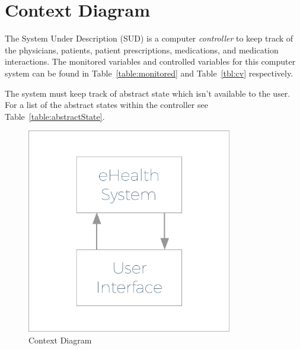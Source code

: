 \section{Context Diagram}
 
The System Under Description (SUD) is a computer \emph{controller} to keep track of the physicians, patients, patient prescriptions, medications, and medication interactions. The monitored variables and controlled variables for this computer system can be found in Table~\ref{table:monitored} and 
Table~\ref{tbl:cv} respectively. 

The system must keep track of abstract state which isn't available to the user. For a list of the abstract states within the controller see Table~\ref{table:abstractState}.

\begin{figure}[htb]
\begin{center}
\includegraphics[width=0.8\textwidth]{pics/ContextDiagramExpanded.pdf}
\end{center}
\caption{Context Diagram}
\label{fig:modes}
\end{figure}